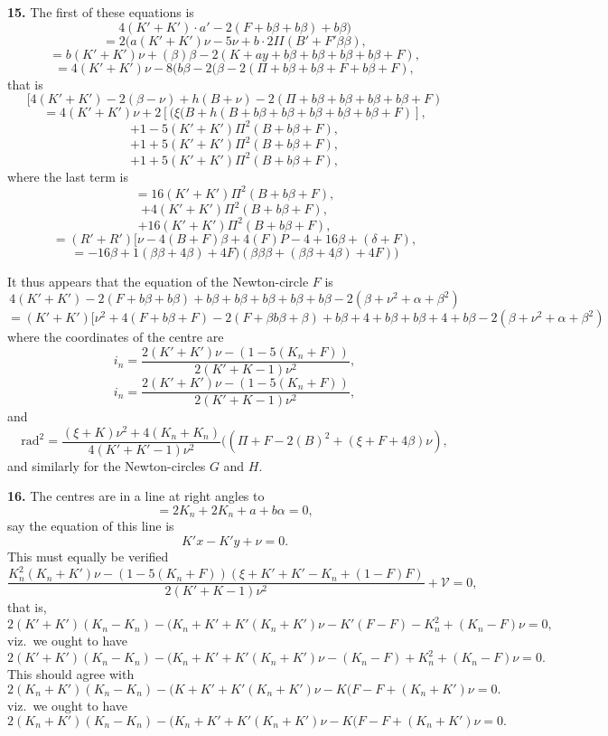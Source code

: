 \documentclass[11pt,a4paper]{book}
\begin{document}
\textbf{15.} The first of these equations is
\[
4(K' + K') \cdot a' - 2(F + b\beta + b\beta) + b\beta)
\]
\[
= 2(a (K' + K')\nu - 5\nu + b \cdot 2II (B' + F'\beta\beta),
\]
\[
= b(K' + K')\nu + (\beta)\beta - 2(K + a y + b\beta + b\beta + b\beta + b\beta + F),
\]
\[
= 4(K' + K')\nu - 8(b\beta - 2(\beta - 2(\Pi + b\beta + b\beta + F + b\beta + F),
\]
that is
\[
[4(K' + K') - 2(\beta - \nu) + h(B + \nu) - 2(\Pi + b\beta + b\beta + b\beta + b\beta + F)
\]
\[
= 4(K' + K')\nu + 2[(\xi(B + h(B + b\beta + b\beta + b\beta + b\beta + b\beta + F)],
\]
\[
+ 1 - 5(K' + K')\Pi^2(B + b\beta + F),
\]
\[
+ 1 + 5(K' + K')\Pi^2(B + b\beta + F),
\]
\[
+ 1 + 5(K' + K')\Pi^2(B + b\beta + F),
\]
where the last term is
\[
= 16(K' + K')\Pi^2(B + b\beta + F),
\]
\[
+ 4(K' + K')\Pi^2(B + b\beta + F),
\]
\[
+ 16(K' + K')\Pi^2(B + b\beta + F),
\]
\[
= (R' + R')[\nu - 4(B + F)\beta + 4(F)P - 4 + 16\beta + (\delta + F),
\]
\[
= - 16\beta + 1(\beta\beta + 4\beta) + 4F)(\beta\beta\beta + (\beta\beta + 4\beta) + 4F))
\]

It thus appears that the equation of the Newton-circle $F$ is
\[
4(K' + K') - 2(F + b\beta + b\beta) + b\beta + b\beta + b\beta + b\beta + b\beta - 2(\beta + \nu^2 + \alpha + \beta^2)
\]
\[
= (K' + K')[\nu^2 + 4(F + b\beta + F) - 2(F + \beta b\beta + \beta) + b\beta + 4 + b\beta + b\beta + 4 + b\beta - 2(\beta + \nu^2 + \alpha + \beta^2)
\]
where the coordinates of the centre are
\[
i_n = \frac{2(K' + K')\nu - (1 - 5(K_n + F))}{2(K' + K - 1)\nu^2},
\]
\[
i_n = \frac{2(K' + K')\nu - (1 - 5(K_n + F))}{2(K' + K - 1)\nu^2},
\]
and
\[
\text{rad}^2 = \frac{(\xi + K)\nu^2 + 4(K_n + K_n)}{4(K' + K' - 1)\nu^2}((\Pi + F - 2(B)^2 + (\xi + F + 4\beta)\nu),
\]
and similarly for the Newton-circles $G$ and $H$.

\textbf{16.} The centres are in a line at right angles to
\[
= 2K_n + 2K_n + a + b\alpha = 0,
\]
say the equation of this line is
\[
K' x - K' y + \nu = 0.
\]
This must equally be verified
\[
\frac{K_n^2(K_n + K')\nu - (1 - 5(K_n + F))(\xi + K' + K' - K_n + (1 - F)F)}{2(K' + K - 1)\nu^2} + \mathcal{V} = 0,
\]
that is,
\[
2(K' + K')(K_n - K_n) - (K_n + K' + K'( K_n + K')\nu - K'(F - F) - K_n^2 + (K_n - F)\nu = 0,
\]
viz.\ we ought to have
\[
2(K' + K')(K_n - K_n) - (K_n + K' + K'( K_n + K')\nu - (K_n - F) + K_n^2 + (K_n - F)\nu = 0.
\]
This should agree with
\[
2(K_n + K')(K_n - K_n) - (K + K' + K'(K_n + K')\nu - K(F - F + (K_n + K')\nu = 0.
\]
viz.\ we ought to have
\[
2(K_n + K')(K_n - K_n) - (K_n + K' + K'( K_n + K')\nu - K(F - F + (K_n + K')\nu = 0.
\]
\end{document}
